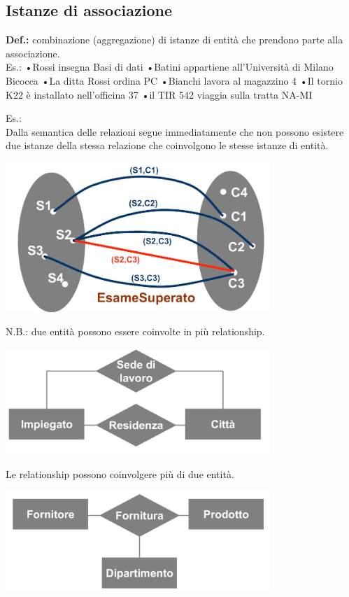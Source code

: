 \subsection{Istanze di associazione}
\textbf{Def.:} combinazione (aggregazione) di istanze di entità che prendono parte alla associazione.
\\Es.:
•Rossi insegna Basi di dati
•Batini appartiene all’Università di Milano Bicocca
•La ditta Rossi ordina PC
•Bianchi lavora al magazzino 4
•Il tornio K22 è installato nell’officina 37
•il TIR 542 viaggia sulla tratta NA-MI

Es.:
\\Dalla semantica delle relazioni segue immediatamente che non possono esistere due istanze della stessa relazione che coinvolgono le stesse istanze di entità.
\begin{center}
    \includegraphics[width=0.75\textwidth]{chaptersLezioniSara/img/Relazioni2.jpg}
\end{center}
N.B.: due entità possono essere coinvolte in più relationship.
\begin{center}
    \includegraphics[width=0.75\textwidth]{chaptersLezioniSara/img/Relazioni3.jpg}
\end{center}
Le relationship possono coinvolgere più di due entità.
\begin{center}
    \includegraphics[width=0.75\textwidth]{chaptersLezioniSara/img/Relazioni4.jpg}
\end{center}

